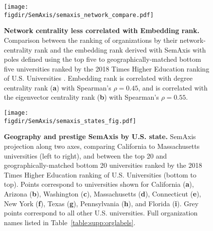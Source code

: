 \documentclass[12pt]{article} %
\def\figdir{../Figs}
\begin{document}
%
%
\begin{figure}[hp!]
	\centering
	\texttt{[image: \\figdir/SemAxis/semaxis\_network\_compare.pdf]}
	\caption{
		\textbf{Network centrality less correlated with Embedding rank.}
		Comparison between the ranking of organizations by their network-centrality rank and the embedding rank derived with SemAxis with poles defined using the top five to geographically-matched bottom five universities ranked by the 2018 Times Higher Education ranking of U.S. Universities .
		Embedding rank is correlated with degree centrality rank (\textbf{a}) with Spearman's $\rho = 0.45$, and is correlated with the eigenvector centrality rank (\textbf{b}) with Spearman's $\rho = 0.55$.
	}
	\label{fig:supp:centrality_semaxis_compare}
\end{figure}


%
%
\begin{figure}[hp!]
	\centering
	\texttt{[image: \\figdir/SemAxis/semaxis\_states\_fig.pdf]}
	\caption{
		\textbf{Geography and prestige SemAxis by U.S. state.}
		SemAxis projection along two axes, comparing California to Massachusetts universities (left to right), and between the top 20 and geographically-matched bottom 20 universities ranked by the 2018 Times Higher Education ranking of U.S. Universities (bottom to top).
		Points correspond to universities shown for California (\textbf{a}), Arizona (\textbf{b}), Washington (\textbf{c}), Massachusetts (\textbf{d}), Connecticut (\textbf{e}), New York (\textbf{f}), Texas (\textbf{g}), Pennsylvania (\textbf{h}), and Florida (\textbf{i}).
		Grey points correspond to all other U.S. universities.
		Full organization names listed in Table~\ref{table:supp:orglabels}.
	}
	\label{fig:supp:semaxis_states}
\end{figure}


%
%
\end{document}
